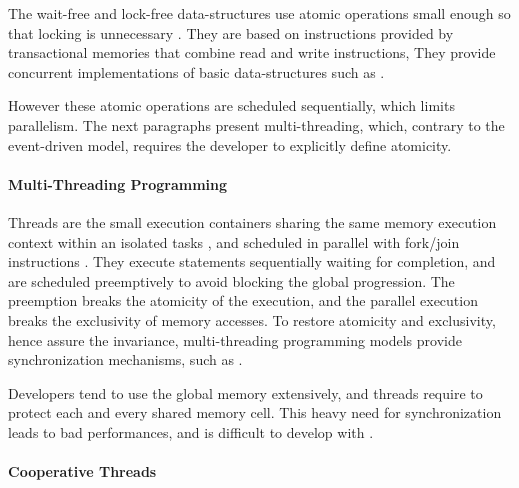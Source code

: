 The wait-free and lock-free data-structures use atomic operations small enough so that locking is unnecessary \cite{Lamport1977,Herlihy1988,Herlihy1990,Herlihy1991,Anderson1990}.
They are based on instructions provided by transactional memories \cite{Harris2010} that combine read and write instructions,
They provide concurrent implementations of basic data-structures such as .

However these atomic operations are scheduled sequentially, which limits parallelism.
The next paragraphs present multi-threading, which, contrary to the event-driven model, requires the developer to explicitly define atomicity.



\paragraph{Multi-Threading Programming}

Threads are the small execution containers sharing the same memory execution context within an isolated tasks \cite{Dijkstra1968}, and scheduled in parallel with fork/join instructions \cite{Randall1998,Frigo1998,Leiserson2010}.
They execute statements sequentially waiting for completion, and are scheduled preemptively to avoid blocking the global progression.
The preemption breaks the atomicity of the execution, and the parallel execution breaks the exclusivity of memory accesses.
To restore atomicity and exclusivity, hence assure the invariance, multi-threading programming models provide synchronization mechanisms, such as .

Developers tend to use the global memory extensively, and threads require to protect each and every shared memory cell.
This heavy need for synchronization leads to bad performances, and is difficult to develop with \cite{Adya2002}.

\paragraph{Cooperative Threads}

